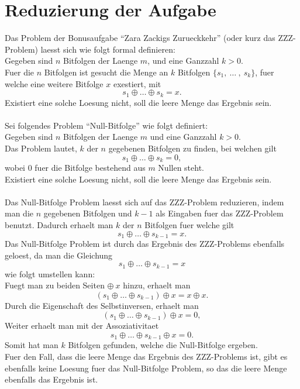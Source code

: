 \documentclass[a4paper,10pt,ngerman]{scrartcl}
\begin{document}
\section{Reduzierung der Aufgabe}
Das Problem der Bonusaufgabe "`Zara Zackigs Zurueckkehr"' (oder kurz das ZZZ-Problem) laesst sich wie folgt formal definieren:\\
Gegeben sind \(n\) Bitfolgen der Laenge \(m\), und eine Ganzzahl $k > 0$.\\
Fuer die \(n\) Bitfolgen ist gesucht die Menge an \(k\) Bitfolgen \( \{ s_1, \ \dots \ , \ s_k \} \), fuer welche eine weitere Bitfolge \(x\) exestiert, mit
\[s_1 \oplus \dots \oplus s_k = x. \]
Existiert eine solche Loesung nicht, soll die leere Menge das Ergebnis sein.
\\\\
Sei folgendes Problem "`Null-Bitfolge"' wie folgt definiert:\\
Gegeben sind \(n\) Bitfolgen der Laenge $m$ und eine Ganzzahl $k > 0$.\\
Das Problem lautet, \(k\) der \(n\) gegebenen Bitfolgen zu finden, bei welchen gilt
\[s_1 \oplus \dots \oplus s_k = 0, \] 
wobei 0 fuer die Bitfolge bestehend aus $m$ Nullen steht.\\
Existiert eine solche Loesung nicht, soll die leere Menge das Ergebnis sein.
\\\\
Das Null-Bitfolge Problem laesst sich auf das ZZZ-Problem reduzieren, indem man die $n$ gegebenen Bitfolgen und $k-1$ als Eingaben fuer das ZZZ-Problem benutzt.
Dadurch erhaelt man $k$ der $n$ Bitfolgen fuer welche gilt
\[s_1 \oplus \dots \oplus s_{k-1} = x. \] 
Das Null-Bitfolge Problem ist durch das Ergebnis des ZZZ-Problems ebenfalls geloest, da man die Gleichung 
\[s_1 \oplus \dots \oplus s_{k-1} = x \]  
wie folgt umstellen kann:\\
Fuegt man zu beiden Seiten \(\oplus \ x \) hinzu, erhaelt man
\[(s_1 \oplus \dots \oplus s_{k-1}) \oplus x = x \oplus x . \] 
Durch die Eigenschaft des Selbstinversen, erhaelt man
\[(s_1 \oplus \dots \oplus s_{k-1}) \oplus x = 0,  \] 
Weiter erhaelt man mit der Assoziativitaet
\[s_1 \oplus \dots \oplus s_{k-1} \oplus x = 0 . \] 
Somit hat man $k$ Bitfolgen gefunden, welche die Null-Bitfolge ergeben.
\\Fuer den Fall, dass die leere Menge das Ergebnis des ZZZ-Problems ist, gibt es ebenfalls keine Loesung fuer das Null-Bitfolge Problem, so das die leere Menge ebenfalls das Ergebnis ist.
\\\\
\end{document}
